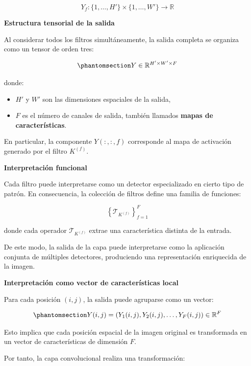 \documentclass[
  spanish,
  us-letterpaper,
]{scrreprt}
\providecommand{\tightlist}{%
  \setlength{\itemsep}{0pt}\setlength{\parskip}{0pt}}
\theoremstyle{definition}
\theoremstyle{remark}
\begin{document}
\[
Y_f : \{1,\dots,H'\} \times \{1,\dots,W'\} \to \mathbb{R}
\]

\textbf{Estructura tensorial de la salida}

Al considerar todos los filtros simultáneamente, la salida completa se
organiza como un tensor de orden tres:

\begin{equation}\phantomsection\label{eq-salida-tensor}{
Y \in \mathbb{R}^{H' \times W' \times F}
}\end{equation}

donde:

\begin{itemize}
\tightlist
\item
  \(H'\) y \(W'\) son las dimensiones espaciales de la salida,
\item
  \(F\) es el número de canales de salida, también llamados
  \textbf{mapas de características}.
\end{itemize}

En particular, la componente \(Y(:,:,f)\) corresponde al mapa de
activación generado por el filtro \(K^{(f)}\).

\textbf{Interpretación funcional}

Cada filtro puede interpretarse como un detector especializado en cierto
tipo de patrón. En consecuencia, la colección de filtros define una
familia de funciones:

\[
\left\{ \mathcal{T}_{K^{(f)}} \right\}_{f=1}^{F}
\]

donde cada operador \(\mathcal{T}_{K^{(f)}}\) extrae una característica
distinta de la entrada.

De este modo, la salida de la capa puede interpretarse como la
aplicación conjunta de múltiples detectores, produciendo una
representación enriquecida de la imagen.

\textbf{Interpretación como vector de características local}

Para cada posición \((i,j)\), la salida puede agruparse como un vector:

\begin{equation}\phantomsection\label{eq-vector-local}{
Y(i,j) = \left( Y_1(i,j), Y_2(i,j), \dots, Y_F(i,j) \right) \in \mathbb{R}^{F}
}\end{equation}

Esto implica que cada posición espacial de la imagen original es
transformada en un vector de características de dimensión \(F\).

Por tanto, la capa convolucional realiza una transformación:
\end{document}
